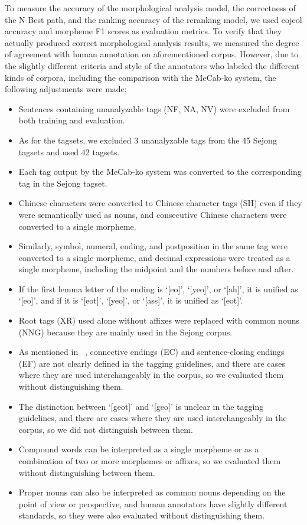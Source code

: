 \documentclass[AMS,STIX2COL]{WileyNJD-v2}
\begin{document}
    To measure the accuracy of the morphological analysis model, the correctness of the N-Best path, and the ranking accuracy of the reranking model, we used eojeol accuracy and morpheme F1 scores as evaluation metrics. To verify that they actually produced correct morphological analysis results, we measured the degree of agreement with human annotation on aforementioned corpus. However, due to the slightly different criteria and style of the annotators who labeled the different kinds of corpora, including the comparison with the MeCab-ko system, the following adjustments were made:
    \begin{itemize}
        \item Sentences containing unanalyzable tags (NF, NA, NV) were excluded from both training and evaluation.
        \item As for the tagsets, we excluded 3 unanalyzable tags from the 45 Sejong tagsets and used 42 tagsets.
        \item Each tag output by the MeCab-ko system was converted to the corresponding tag in the Sejong tagset.
        \item Chinese characters were converted to Chinese character tags (SH) even if they were semantically used as nouns, and consecutive Chinese characters were converted to a single morpheme.
        \item Similarly, symbol, numeral, ending, and postposition in the same tag were converted to a single morpheme, and decimal expressions were treated as a single morpheme, including the midpoint and the numbers before and after.
        \item If the first lemma letter of the ending is `[eo]', `[yeo]', or `[ah]', it is unified as `[eo]', and if it is `[eot]', `[yeo]', or `[ass]', it is unified as `[eot]'. %
        \item Root tags (XR) used alone without affixes were replaced with common nouns (NNG) because they are mainly used in the Sejong corpus.
        \item As mentioned in ~\cite{KimIH2010}, connective endings (EC) and sentence-closing endings (EF) are not clearly defined in the tagging guidelines, and there are cases where they are used interchangeably in the corpus, so we evaluated them without distinguishing them.
        \item The distinction between `[geot]' and `[geo]' is unclear in the tagging guidelines, and there are cases where they are used interchangeably in the corpus, so we did not distinguish between them. %
        \item Compound words can be interpreted as a single morpheme or as a combination of two or more morphemes or affixes, so we evaluated them without distinguishing between them.
        \item Proper nouns can also be interpreted as common nouns depending on the point of view or perspective, and human annotators have slightly different standards, so they were also evaluated without distinguishing them.
    \end{itemize}
\end{document}
